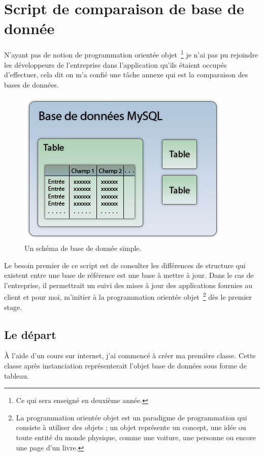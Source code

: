 \chapter{Script de comparaison de base de donnée}

N'ayant pas de notion de programmation orientée objet\, \footnote{Ce qui sera
enseigné en deuxième année.} je n'ai pas pu rejoindre les développeurs de
l'entreprise dans l'application qu'ils étaient occupés d'effectuer, cela dit on
m'a confié une tâche annexe qui est la comparaison des bases de données.

\begin{figure}
\begin{center}
\includegraphics[scale=0.5]{images/bdd.png}
\end{center}
\caption{Un schéma de base de donnée simple.}
\end{figure}

Le besoin premier de ce script est de consulter les différences de structure
qui existent entre une base de référence est une base à mettre à jour. Dans le
cas de l'entreprise, il permettrait un suivi des mises à jour des applications
fournies au client et pour moi, m'initier à la programmation orientée objet\,
\footnote{La programmation orientée objet est un paradigme de programmation qui
consiste à utiliser des objets ; un objet représente un concept, une idée ou
toute entité du monde physique, comme une voiture, une personne ou encore une
page d'un livre.} dès le premier stage.

\section{Le départ}

À l'aide d'un cours sur internet, j'ai commencé à créer ma première classe.
Cette classe après instanciation représenterait l'objet \og base de données
\fg{} sous forme de tableau.

